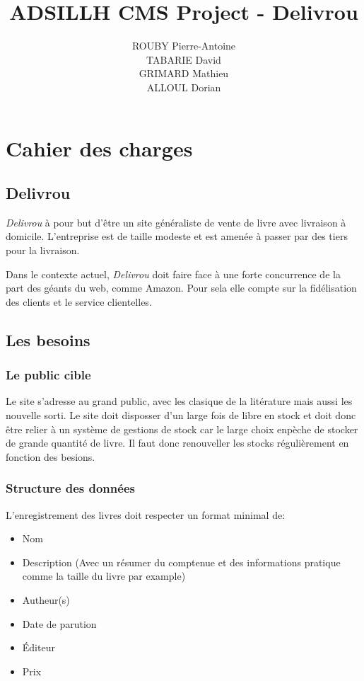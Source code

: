 \documentclass[a4paper,12pt]{report}
\title{ADSILLH CMS Project - Delivrou}
\author{ROUBY Pierre-Antoine \\ TABARIE David \\ GRIMARD Mathieu \\
  ALLOUL Dorian}
\begin{document}
\maketitle
\tableofcontents

\part{Cahier des charges}
\chapter{Delivrou}
\textit{Delivrou} à pour but d'être un site généraliste de vente de livre
avec livraison à domicile. L'entreprise est de taille modeste et est amenée
à passer par des tiers pour la livraison.

Dans le contexte actuel, \textit{Delivrou} doit faire face à une forte
concurrence de la part des géants du web, comme Amazon. Pour sela elle compte
sur la fidélisation des clients et le service clientelles.

\chapter{Les besoins}
\section{Le public cible}
Le site s'adresse au grand public, avec les clasique de la litérature mais
aussi les nouvelle sorti. Le site doit disposser d'un large fois de libre en
stock et doit donc être relier à un système de gestions de stock car le large
choix enpèche de stocker de grande quantité de livre. Il faut donc renouveller
les stocks régulièrement en fonction des besions.

\section{Structure des données}
L'enregistrement des livres doit respecter un format minimal de:
\begin{itemize}
\item Nom
\item Description (Avec un résumer du comptenue et des informations pratique
  comme la taille du livre par example)
\item Autheur(s)
\item Date de parution
\item Éditeur
\item Prix
\end{itemize}
\end{document}
